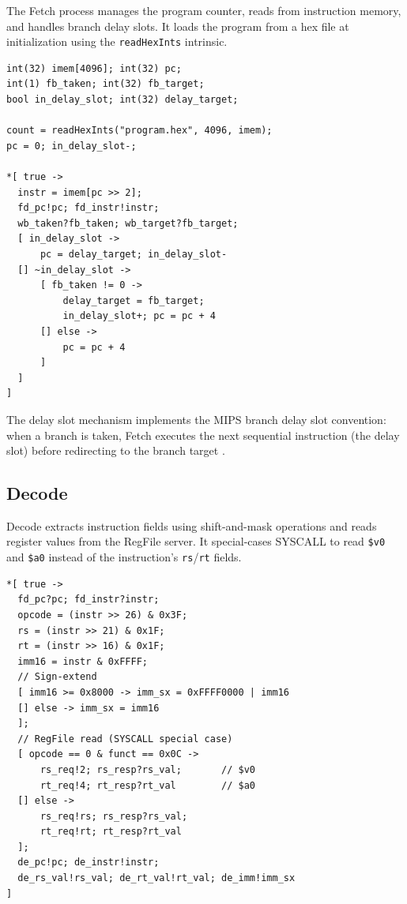 \documentclass[11pt]{article}
\begin{document}
The Fetch process manages the program counter, reads from instruction memory,
and handles branch delay slots.  It loads the program from a hex file at
initialization using the \texttt{readHexInts} intrinsic.

\begin{lstlisting}[style=csp,caption={Fetch process}]
int(32) imem[4096]; int(32) pc;
int(1) fb_taken; int(32) fb_target;
bool in_delay_slot; int(32) delay_target;

count = readHexInts("program.hex", 4096, imem);
pc = 0; in_delay_slot-;

*[ true ->
  instr = imem[pc >> 2];
  fd_pc!pc; fd_instr!instr;
  wb_taken?fb_taken; wb_target?fb_target;
  [ in_delay_slot ->
      pc = delay_target; in_delay_slot-
  [] ~in_delay_slot ->
      [ fb_taken != 0 ->
          delay_target = fb_target;
          in_delay_slot+; pc = pc + 4
      [] else ->
          pc = pc + 4
      ]
  ]
]
\end{lstlisting}

The delay slot mechanism implements the MIPS branch delay slot convention:
when a branch is taken, Fetch executes the next sequential instruction (the
delay slot) before redirecting to the branch target
\cite{Patterson2014,MIPSR3000}.

\subsection{Decode}

Decode extracts instruction fields using shift-and-mask operations and reads
register values from the RegFile server.  It special-cases SYSCALL to read
\texttt{\$v0} and \texttt{\$a0} instead of the instruction's \texttt{rs}/\texttt{rt}
fields.

\begin{lstlisting}[style=csp,caption={Decode process (simplified)}]
*[ true ->
  fd_pc?pc; fd_instr?instr;
  opcode = (instr >> 26) & 0x3F;
  rs = (instr >> 21) & 0x1F;
  rt = (instr >> 16) & 0x1F;
  imm16 = instr & 0xFFFF;
  // Sign-extend
  [ imm16 >= 0x8000 -> imm_sx = 0xFFFF0000 | imm16
  [] else -> imm_sx = imm16
  ];
  // RegFile read (SYSCALL special case)
  [ opcode == 0 & funct == 0x0C ->
      rs_req!2; rs_resp?rs_val;       // $v0
      rt_req!4; rt_resp?rt_val        // $a0
  [] else ->
      rs_req!rs; rs_resp?rs_val;
      rt_req!rt; rt_resp?rt_val
  ];
  de_pc!pc; de_instr!instr;
  de_rs_val!rs_val; de_rt_val!rt_val; de_imm!imm_sx
]
\end{lstlisting}
\end{document}
